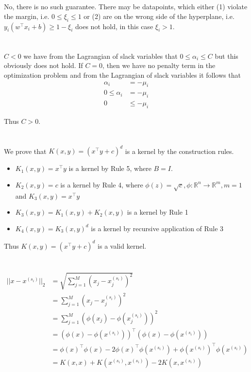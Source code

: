 \documentclass[11pt]{article}
\newcommand{\exercise}{\section{}}
\newcommand{\sumf}[3]{\sum_{#1}^{#2} #3}
\newcommand{\tf}[1]{{#1}^{\intercal}}
\begin{document}
\exercise

No, there is no such guarantee. There may be datapoints, which either (1) violate the margin, i.e. $0 \le \xi_i \le 1$ or (2) are on the wrong side of the hyperplane, i.e. $y_i (\tf{w} x_i + b) \ge 1 - \xi_i$ does not hold, in this case $\xi_i > 1$.

\exercise

$C < 0$ we have from the Lagrangian of slack variables that $0 \le \alpha_i \le C$ but this obviously does not hold. If $ C = 0$, then we have no penalty term in the optimization problem and from the Lagrangian of slack variables it follows that
\begin{align*}
\alpha_i &= - \mu_i \\
0 \le \alpha_i &= - \mu_i \\
0 &\le -\mu_i  \tag{violation of dual feasibility of Lagrangian multipliers $\mu_i \ge 0$ }
\end{align*}

\noindent Thus $C > 0$.

\exercise

We prove that $ K(x,y) = ( \tf{x} y + c)^d $ is a kernel by the construction rules.

\begin{itemize}
\item $K_1(x, y) = \tf{x} y$ is a kernel by Rule 5, where $B = I$.
\item $K_2(x, y) = c$ is a kernel by Rule 4, where $ \phi(z) = \sqrt{c}, \phi : \mathbb{R}^n \rightarrow \mathbb{R}^m, m = 1$ and $K_3(x, y) = \tf{x} y $
\item $K_3(x, y) = K_1(x, y) + K_2(x, y)$ is a kernel by Rule 1
\item $K_4(x, y) = K_3(x, y)^d$ is a kernel by recursive application of Rule 3
\end{itemize}

Thus $ K(x,y) = ( \tf{x} y + c)^d $ is a valid kernel.

\exercise

\exercise

\exercise

\exercise

\begin{align*}
|| x - x^{(s_i)} ||_2 &= \sqrt{\sumf{j = 1}{M}{(x_j - x_j^{(s_i)})^2}} \\
&= \sumf{j = 1}{M}{(x_j - x_j^{(s_i)})^2} \tag{squared distance does not change k nearest neighbors of $x$} \\
&= \sumf{j = 1}{M}{(\phi(x_j) - \phi(x_j^{(s_i)}))^2} \tag{ by feature map $\phi(x)$ } \\
&= \tf{(\phi(x) - \phi(x^{(s_i)}))} (\phi(x) - \phi(x^{(s_i)})) \\
&= \tf{\phi(x)} \phi(x) - 2 \tf{ \phi(x) }  \phi(x^{(s_i)}) + \tf{ \phi(x^{(s_i)}) }  \phi(x^{(s_i)}) \\
&= K(x, x)  + K(x^{(s_i)}, x^{(s_i)}) - 2 K(x, x^{(s_i)})
\end{align*}
\end{document}
